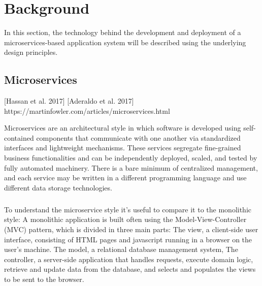 
%

\chapter{Background}
\label{cha:background}

In this section, the technology behind the development and deployment of a microservices-based
application system will be described using the underlying design principles.

\section{Microservices} %
\label{sec:microservices}

[Hassan et al. 2017]
[Aderaldo et al. 2017]
https://martinfowler.com/articles/microservices.html

Microservices are an architectural style in which software is developed using self-contained components that
communicate with one another via standardized interfaces and lightweight mechanisms.
These services segregate fine-grained business functionalities and can be independently deployed, scaled, and tested by fully automated machinery.
There is a bare minimum of centralized management, and each service may be written in a different programming language and use different data storage technologies.

\paragraph{}

To understand the microservice style it's useful to compare it to the monolithic style:
A monolithic application is built often using the Model-View-Controller (MVC) pattern, which is divided in three main parts:
The view, a client-side user interface, consisting of HTML pages and javascript running in a browser on the user's machine.
The model, a relational database management system,
The controller, a server-side application that handles requests, execute domain logic, retrieve and update data from the database, and selects and populates the views to be sent to the browser.


